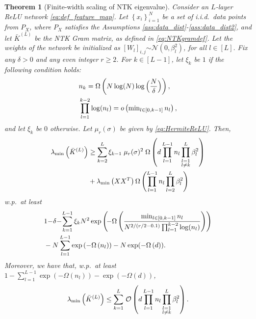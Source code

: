 \documentclass[11pt]{article}
\newcommand{\revision}[1]{#1}
\def\Set#1{\left\{ #1 \right\}}
\newcommand{\distas}[1]{\mathbin{\overset{#1}{\sim}}}
\newtheorem{theorem}{Theorem}[section]
\newcommand{\littleO}[1]{o\left(#1\right)}
\newcommand{\bigO}[1]{\mathcal{O}\left(#1\right)}
\newcommand{\bigOmg}[1]{\Omega\left(#1\right)}
\newcommand{\bigexp}[1]{\exp\left(#1\right)}
\newcommand{\evmin}[1]{\lambda_{\rm min}\left(#1\right)}
\def\min{\mathop{\rm min}\nolimits}
\begin{document}
\begin{theorem}[Finite-width scaling of NTK eigenvalue] \label{thm:empirical_Jacobian}
    Consider an $L$-layer ReLU network \eqref{eq:def_feature_map}.
    Let $\Set{x_i}_{i=1}^{N}$ be a set of i.i.d.\ data points from $P_X$, 
    where $P_X$ satisfies the Assumptions \ref{ass:data_dist}-\ref{ass:data_dist2},
    and let $\bar{K}^{(L)}$ be the NTK Gram matrix, as defined in \eqref{eq:NTKgramdef}.
    Let the weights of the network be initialized as
    $[W_l]_{i,j}\distas{}\mathcal{N}(0,\beta_l^2)$, for all $l\in[L].$
    Fix any $\delta>0$ and any even integer $r\ge 2$. For $k\in[L-1]$, let $\xi_k$ be $1$ if the following condition holds:
        \vspace{-5pt}
    \begin{align}
	&n_k = \bigOmg{N\log(N) \log\Big(\frac{N}{\delta}\Big)},\\
	&\prod_{l=1}^{k-2} \log(n_l)=\littleO{\min_{l\in[0,k-1]} n_l},
    \end{align}
    and let $\xi_k$ be $0$ otherwise.
    Let $\mu_r(\sigma)$ be given by \eqref{eq:HermiteReLU}.
    Then,
          \vspace{-5pt}
  \begin{align}\label{eq:Jacobian_lowerbound}
	\evmin{\bar{K}^{(L)}} 
	&\geq\sum_{k=2}^{L} \xi_{k-1}\; \mu_r(\sigma)^2\; 
	\bigOmg{d\prod_{l=1}^{L-1}n_l \prod_{\substack{l=1\\l\neq k}}^{L}\beta_l^2 } \nonumber\\
	&+ \evmin{XX^T} \bigOmg{\prod_{l=1}^{L-1}n_l \prod_{l=2}^{L}\beta_l^2 } 
    \end{align}
    w.p.\ at least
            \vspace{-5pt}
    \begin{align}\label{eq:prob}
	&1 \hspace{-.2em}-\hspace{-.2em} \delta \hspace{-.2em}-\hspace{-.2em} \sum_{k=1}^{L-1} \xi_k N^2 \bigexp{ \hspace{-.2em}- \bigOmg{ \frac{\min_{l\in[0,k-1]}n_l}{N^{2/(\revision{r/2}-0.1)} \prod_{l=1}^{k-2}\log(n_l)} } } \nonumber\\
	&- N \sum_{l=1}^{L-1} \bigexp{-\bigOmg{n_l}} - N \exp(-\bigOmg{d}) .
    \end{align}
    Moreover, we have that, w.p.\ at least $1 - \sum_{l=1}^{L-1} \bigexp{-\bigOmg{n_l}} - \exp(-\bigOmg{d})$,
             \vspace{-5pt}
   \begin{align}\label{eq:Jacobian_upperbound}
	\evmin{\bar{K}^{(L)}} 
	\leq\sum_{k=1}^{L}\,
	\bigO{d\prod_{l=1}^{L-1}n_l \prod_{\substack{l=1\\l\neq k}}^{L}\beta_l^2 }. 
    \end{align}
\end{theorem}
\end{document}
